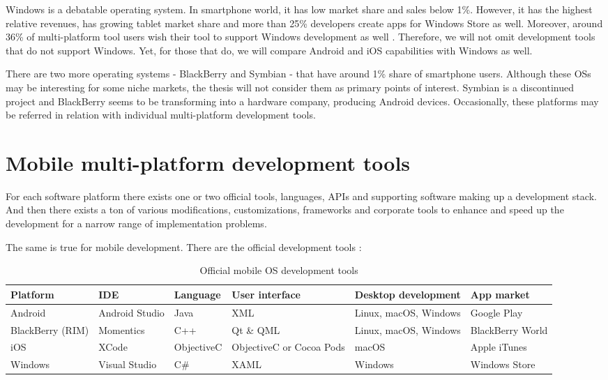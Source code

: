 \documentclass[english,master,public,dept460,male,cpdeclaration,oneside]{diploma}
\begin{document}
Windows is a debatable operating system. In smartphone world, it has low market share and sales below 1\%. However, it has the highest relative revenues, has growing tablet market share and more than 25\% developers create apps for Windows Store as well. Moreover, around 36\% of multi-platform tool users wish their tool to support Windows development as well \cite{cptBenchmarking2014}. Therefore, we will not omit development tools that do not support Windows. Yet, for those that do, we will compare Android and iOS capabilities with Windows as well.

There are two more operating systems - BlackBerry and Symbian - that have around 1\% share of smartphone users. Although these OSs may be interesting for some niche markets, the thesis will not consider them as primary points of interest. Symbian is a discontinued project and BlackBerry seems to be transforming into a hardware company, producing Android devices. Occasionally, these platforms may be referred in relation with individual multi-platform development tools.



\section{Mobile multi-platform development tools}
For each software platform there exists one or two official tools, languages, APIs and supporting software making up a development stack. And then there exists a ton of various modifications, customizations, frameworks and corporate tools to enhance and speed up the development for a narrow range of implementation problems.

The same is true for mobile development. There are the official development tools \cite{taxonomyCP}:
\begin{table}[!ht]
	\centering
	\caption{Official mobile OS development tools}
	\begin{tabular}{p{2cm} p{2cm} p{2cm} p{2.5cm} p{2.5cm} p{2.5cm}}
		\toprule
		Platform & IDE & Language & User interface & Desktop development & App market\\
		\midrule
		Android & Android Studio & Java & XML & Linux, macOS, Windows & Google Play\\
		BlackBerry (RIM) & Momentics & C++ & Qt \& QML & Linux, macOS, Windows & BlackBerry World \\
		iOS & XCode & ObjectiveC & ObjectiveC or Cocoa Pods & macOS & Apple iTunes \\
		Windows & Visual Studio & C\# & XAML & Windows & Windows Store \\
		\midrule
	\end{tabular}
\end{table}
\end{document}
